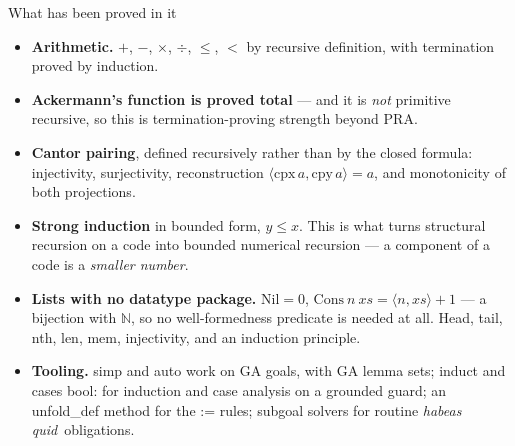 \documentclass[aspectratio=169,11pt]{beamer}
\newcommand{\hq}{\textit{habeas quid}}
\newcommand{\code}[1]{{\ttfamily\footnotesize #1}}
\newcommand{\key}[1]{{\color{accent}\textbf{#1}}}
\begin{document}
\begin{frame}{What has been proved in it}
  \vfill
  \small
  \begin{itemize}\itemsep0.35em
    \item \key{Arithmetic.} $+$, $-$, $\times$, $\div$, $\leq$, $<$ by recursive
          definition, with termination proved by induction.
    \item \key{Ackermann's function is proved total} --- and it is \emph{not}
          primitive recursive, so this is termination-proving strength beyond PRA.
    \item \key{Cantor pairing}, defined recursively rather than by the closed formula:
          injectivity, surjectivity, reconstruction $\langle \mathrm{cpx}\,a,
          \mathrm{cpy}\,a\rangle = a$, and monotonicity of both projections.
    \item \key{Strong induction} in bounded form, $y \leq x$. This is what turns
          structural recursion on a code into bounded numerical recursion --- a
          component of a code is a \emph{smaller number}.
    \item \key{Lists with no datatype package.} $\mathrm{Nil} = 0$,
          $\mathrm{Cons}\ n\ xs = \langle n, xs\rangle + 1$ --- a bijection with
          $\mathbb{N}$, so no well-formedness predicate is needed at all.
          Head, tail, \code{nth}, \code{len}, \code{mem}, injectivity, and an
          induction principle.
    \item \key{Tooling.} \code{simp} and \code{auto} work on GA goals, with GA
          lemma sets; \code{induct} and \code{cases bool:} for induction and case
          analysis on a grounded guard; an \code{unfold\_def} method for the
          \code{:=} rules; subgoal solvers for routine \hq\ obligations.
  \end{itemize}
  \vfill
\end{frame}
\end{document}
